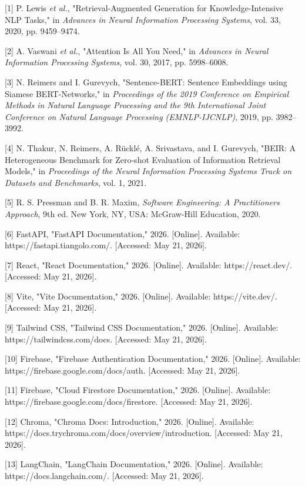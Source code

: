 {[}1{]} P. Lewis \emph{et al.}, "Retrieval-Augmented Generation for
Knowledge-Intensive NLP Tasks," in \emph{Advances in Neural Information
Processing Systems}, vol. 33, 2020, pp. 9459--9474.

{[}2{]} A. Vaswani \emph{et al.}, "Attention Is All You Need," in
\emph{Advances in Neural Information Processing Systems}, vol. 30, 2017,
pp. 5998--6008.

{[}3{]} N. Reimers and I. Gurevych, "Sentence-BERT: Sentence Embeddings
using Siamese BERT-Networks," in \emph{Proceedings of the 2019
Conference on Empirical Methods in Natural Language Processing and the
9th International Joint Conference on Natural Language Processing
(EMNLP-IJCNLP)}, 2019, pp. 3982--3992.

{[}4{]} N. Thakur, N. Reimers, A. Rücklé, A. Srivastava, and I.
Gurevych, "BEIR: A Heterogeneous Benchmark for Zero-shot Evaluation of
Information Retrieval Models," in \emph{Proceedings of the Neural
Information Processing Systems Track on Datasets and Benchmarks}, vol.
1, 2021.

{[}5{]} R. S. Pressman and B. R. Maxim, \emph{Software Engineering: A
Practitioner\textquotesingle s Approach}, 9th ed. New York, NY, USA:
McGraw-Hill Education, 2020.

{[}6{]} FastAPI, "FastAPI Documentation," 2026. {[}Online{]}. Available:
https://fastapi.tiangolo.com/. {[}Accessed: May 21, 2026{]}.

{[}7{]} React, "React Documentation," 2026. {[}Online{]}. Available:
https://react.dev/. {[}Accessed: May 21, 2026{]}.

{[}8{]} Vite, "Vite Documentation," 2026. {[}Online{]}. Available:
https://vite.dev/. {[}Accessed: May 21, 2026{]}.

{[}9{]} Tailwind CSS, "Tailwind CSS Documentation," 2026. {[}Online{]}.
Available: https://tailwindcss.com/docs. {[}Accessed: May 21, 2026{]}.

{[}10{]} Firebase, "Firebase Authentication Documentation," 2026.
{[}Online{]}. Available: https://firebase.google.com/docs/auth.
{[}Accessed: May 21, 2026{]}.

{[}11{]} Firebase, "Cloud Firestore Documentation," 2026. {[}Online{]}.
Available: https://firebase.google.com/docs/firestore. {[}Accessed: May
21, 2026{]}.

{[}12{]} Chroma, "Chroma Docs: Introduction," 2026. {[}Online{]}.
Available: https://docs.trychroma.com/docs/overview/introduction.
{[}Accessed: May 21, 2026{]}.

{[}13{]} LangChain, "LangChain Documentation," 2026. {[}Online{]}.
Available: https://docs.langchain.com/. {[}Accessed: May 21, 2026{]}.

